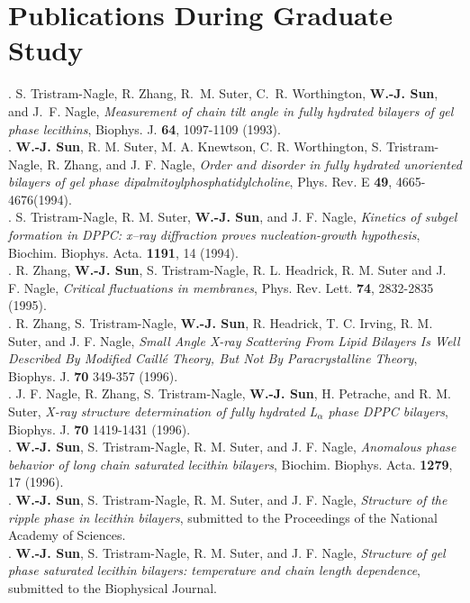 \chapter{Publications During Graduate Study}

. S. Tristram-Nagle, R. Zhang, R.~M. Suter, C.~R. Worthington, 
{\bf W.-J. Sun}, and J.~F. Nagle, {\it Measurement of chain tilt angle in fully 
hydrated bilayers of gel phase lecithins}, Biophys. J. {\bf 64}, 1097-1109 
(1993).\\

. {\bf W.-J. Sun}, R. M. Suter, M. A. Knewtson, C. R. Worthington, 
S. Tristram-Nagle, R. Zhang, and J. F. Nagle, {\it Order and disorder in fully 
hydrated unoriented bilayers of gel phase dipalmitoylphosphatidylcholine},
Phys. Rev. E {\bf 49}, 4665-4676(1994).\\

. S. Tristram-Nagle, R. M. Suter, {\bf W.-J. Sun}, and J. F. Nagle,  {\it
Kinetics of subgel formation in DPPC: x--ray diffraction proves
nucleation-growth hypothesis}, Biochim. Biophys. Acta. {\bf 1191}, 14 (1994).\\

. R. Zhang, {\bf W.-J. Sun}, S. Tristram-Nagle, R. L. Headrick, 
R. M. Suter and J. F. Nagle, {\it Critical fluctuations in membranes}, 
Phys. Rev. Lett. {\bf 74}, 2832-2835 (1995).\\

. R. Zhang, S. Tristram-Nagle, {\bf W.-J. Sun}, R. Headrick, T. C. Irving, 
R. M. Suter, and J. F. Nagle, {\it Small Angle X-ray Scattering From Lipid 
Bilayers Is Well Described By Modified Caill\'e Theory, But Not By 
Paracrystalline Theory}, Biophys. J. {\bf 70} 349-357 (1996).\\

. J. F. Nagle, R. Zhang, S. Tristram-Nagle, {\bf W.-J. Sun}, H. Petrache, and
R. M. Suter, {\it X-ray structure determination of fully hydrated L$_{\alpha}$
phase DPPC bilayers}, Biophys. J. {\bf 70} 1419-1431 (1996).\\

. {\bf W.-J. Sun}, S. Tristram-Nagle, R. M. Suter, and J. F. Nagle, {\it 
Anomalous phase behavior of long chain saturated lecithin bilayers}, 
Biochim. Biophys. Acta. {\bf 1279}, 17 (1996).\\

. {\bf W.-J. Sun}, S. Tristram-Nagle, R. M. Suter, and J. F. Nagle, 
{\it Structure of the ripple phase in lecithin bilayers}, submitted to
the Proceedings of the National Academy of Sciences.\\

. {\bf W.-J. Sun}, S. Tristram-Nagle, R. M. Suter, and J. F. Nagle, {\it 
Structure of gel phase saturated lecithin bilayers: temperature and chain 
length dependence}, submitted to the Biophysical Journal.
